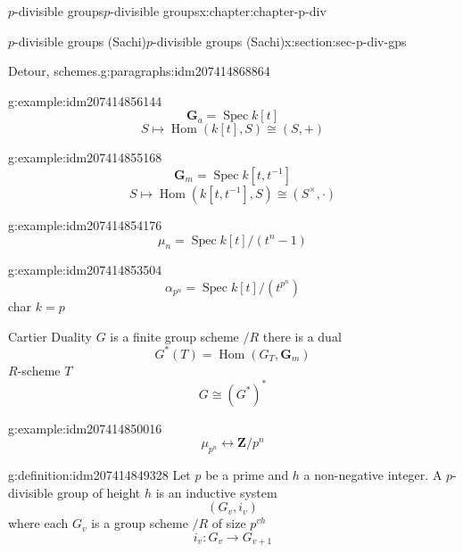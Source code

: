 \documentclass[oneside,10pt,]{book}
\numberwithin{equation}{section}
\newcommand{\inv}{^{-1}}
\newcommand{\ZZ}{\mathbf{Z}}
\DeclareMathOperator{\Hom}{Hom}
\DeclareMathOperator{\Spec}{Spec}
\begin{document}
\begin{chapterptx}{\(p\)-divisible groups}{}{\(p\)-divisible groups}{}{}{x:chapter:chapter-p-div}
\begin{sectionptx}{\(p\)-divisible groups (Sachi)}{}{\(p\)-divisible groups (Sachi)}{}{}{x:section:sec-p-div-gps}
\begin{paragraphs}{Detour, schemes.}{g:paragraphs:idm207414868864}
\begin{example}{}{g:example:idm207414856144}
%
\begin{equation*}
\mathbf G_a = \Spec k[t]
\end{equation*}
%
\begin{equation*}
S\mapsto \Hom(k[t], S) \cong (S,+)
\end{equation*}
%
\end{example}
\begin{example}{}{g:example:idm207414855168}%
%
\begin{equation*}
\mathbf G_m = \Spec k[t,t\inv]
\end{equation*}
%
\begin{equation*}
S\mapsto \Hom(k[t,t\inv], S) \cong (S^\times,\cdot)
\end{equation*}
%
\end{example}
\begin{example}{}{g:example:idm207414854176}%
%
\begin{equation*}
\mu_n = \Spec k[t]/(t^n -1)
\end{equation*}
%
\end{example}
\begin{example}{}{g:example:idm207414853504}%
%
\begin{equation*}
\alpha_{p^n} = \Spec k[t]/(t^{p^n})
\end{equation*}
char \(k = p\)%
\end{example}
Cartier Duality \(G\) is a finite group scheme \(/R\) there is a dual%
\begin{equation*}
G^* (T) = \Hom (G_T, \mathbf G_m)
\end{equation*}
\(R\)-scheme \(T\)%
\begin{equation*}
G \cong (G^*)^*
\end{equation*}
%
\begin{example}{}{g:example:idm207414850016}%
%
\begin{equation*}
\mu_{p^n} \leftrightarrow \ZZ/p^n
\end{equation*}
%
\end{example}
\begin{definition}{}{g:definition:idm207414849328}%
Let \(p\) be a prime and \(h\) a non-negative integer. A \(p\)-divisible group of height \(h\) is an inductive system%
\begin{equation*}
(G_v, i_v)
\end{equation*}
where each \(G_v\) is a group scheme \(/R\) of size \(p^{vh}\)%
\begin{equation*}
i_v \colon G_v \to G_{v+1}
\end{equation*}

\end{definition}
\end{paragraphs}
\end{sectionptx}
\end{chapterptx}
\end{document}

